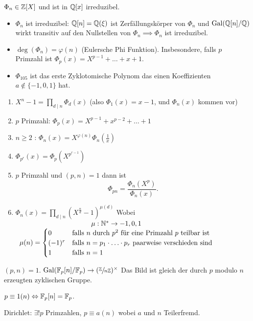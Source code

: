 \begin{corollary}
	$\Phi_{n} \in \mathbb{Z}[X]$ und ist in $\mathbb{Q}[x]$ irreduzibel.
\end{corollary}


\begin{itemize}
	\item $\Phi_{n}$ ist irreduzibel: $\mathbb{Q}[n] = \mathbb{Q}(\xi)$ ist Zerfällungskörper von $\Phi_{n}$ und $\operatorname{Gal}(\mathbb{Q}[n] / \mathbb{Q})$ wirkt transitiv auf den Nullstellen von $\Phi_{n} \implies \Phi_{n}$ 
ist irreduzibel.
	\item $\deg(\Phi_{n}) = \varphi(n)$ (Eulersche Phi Funktion). Insbesondere, falls $p$ Primzahl ist $\Phi_{p}(x) = X^{p-1} + \ldots + x + 1$.
	\item $\Phi_{105}$ ist das erste Zyklotomische Polynom das einen Koeffizienten $a \not\in \{-1,0,1\}$ hat.
\end{itemize}

\begin{proposition}
	\begin{enumerate}
		\item $X^{n}-1 = \prod_{d \mid n} \Phi_{d}(x)$ (also $\Phi_{1}(x) = x-1$, und $\Phi_{n}(x)$ kommen vor)
		\item $p$ Primzahl: $\Phi_{p}(x) = X^{p-1} + x^{p-2} + \ldots + 1$
		\item $n \geq 2$ : $\Phi_{n}(x) = X^{\varphi(n)} \Phi_{n}(\frac{1}{x})$
		\item $\Phi_{p^{r}}(x) = \Phi_{p}(X^{p^{r-1}})$ 
		\item $p$ Primzahl und $(p,n) = 1$ dann ist
			\[
				\Phi_{pn} = \frac{\Phi_{n}(X^{p})}{\Phi_{n}(x)}
			.\]
		\item $\Phi_{n}(x) = \prod_{d \mid n} (X^{\frac{n}{d}}-1)^{\mu(d)}$ Wobei $\begin{array}{c} \mu: \mathbb{N}^{*} \to {-1,0,1}\\ \mu(n) = \begin{cases}
					0 &\text{falls $n$ durch $p^2$ für eine Primzahl $p$ teilbar ist}\\
				(-1)^{r} &\text{falls } n = p_1 \cdot \ldots\cdot p_{r} \text{ paarweise verschieden sind}\\
			1 &\text{falls } n = 1
	\end{cases}\\ \end{array}$
	\end{enumerate}
\end{proposition}

\begin{theorem}
	$(p,n) = 1$. $\operatorname{Gal}(\mathbb{F}_{p}[n] / \mathbb{F}_{p}) \to  (\sfrac{\mathbb{Z}}{n\mathbb{Z}})^{\times}$ 
	Das Bild ist gleich der durch $p$ modulo $n$ erzeugten zyklischen Gruppe.

	$p \equiv 1 (n) \Leftrightarrow \mathbb{F}_{p}[n] = \mathbb{F}_{p}$.
\end{theorem}

Dirichlet: $\exists! p $ Primzahlen, $p \equiv a (n)$ wobei $a$ und $n$ Teilerfremd.

























